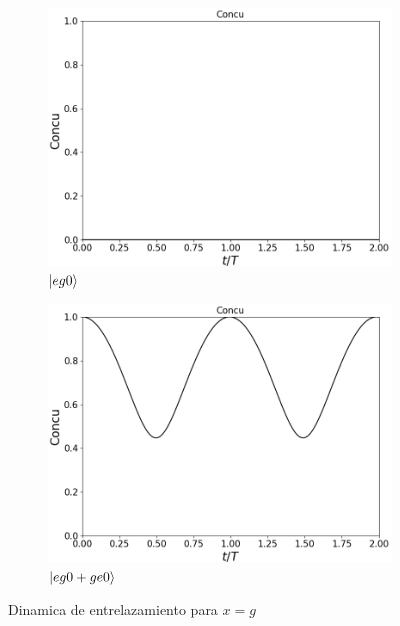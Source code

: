 \begin{figure}[h]
    \centering
    \begin{subfigure}{0.49\textwidth}
        \includegraphics[width=\textwidth]{figuras/ch4/x eg0 concu.png}
        \caption{$\ket{eg0}$}
        \label{fig4:concu x eg0}
    \end{subfigure}
    \hfill
    \begin{subfigure}{0.49\textwidth}
        \includegraphics[width=\textwidth]{figuras/ch4/x eg0+ concu.png}
        \caption{$\ket{eg0+ge0}$}
        \label{fig4:concu x eg0 sim}
    \end{subfigure}
    \caption{Dinamica de entrelazamiento para $x=g$}
    \label{fig4:concu x}
\end{figure}
